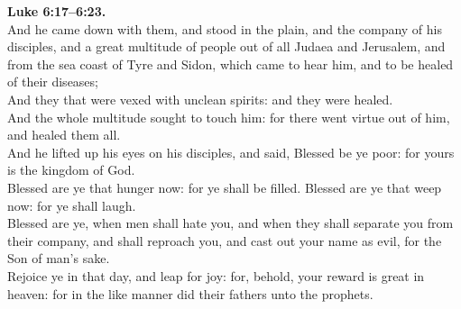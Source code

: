 \documentclass[12pt]{article} %
\begin{document}
{\begin{minipage}[t]{0.45\textwidth}
\textbf{Luke 6:17--6:23.}\\
And he came down with them, and stood in the plain, and the company of his disciples, and a great multitude of people out of all Judaea and Jerusalem, and from the sea coast of Tyre and Sidon, which came to hear him, and to be healed of their diseases;\\
And they that were vexed with unclean spirits: and they were healed.\\
And the whole multitude sought to touch him: for there went virtue out of him, and healed them all.\\
And he lifted up his eyes on his disciples, and said, Blessed be ye poor: for yours is the kingdom of God.\\
Blessed are ye that hunger now: for ye shall be filled. Blessed are ye that weep now: for ye shall laugh.\\
Blessed are ye, when men shall hate you, and when they shall separate you from their company, and shall reproach you, and cast out your name as evil, for the Son of man's sake.\\
Rejoice ye in that day, and leap for joy: for, behold, your reward is great in heaven: for in the like manner did their fathers unto the prophets.\\

\end{minipage}}
\vspace*{\fill}
\newpage
\Huge%
\vspace*{\fill}
\begin{spacing}{1.3}
\end{spacing}
\vspace*{\fill}
\end{document}

